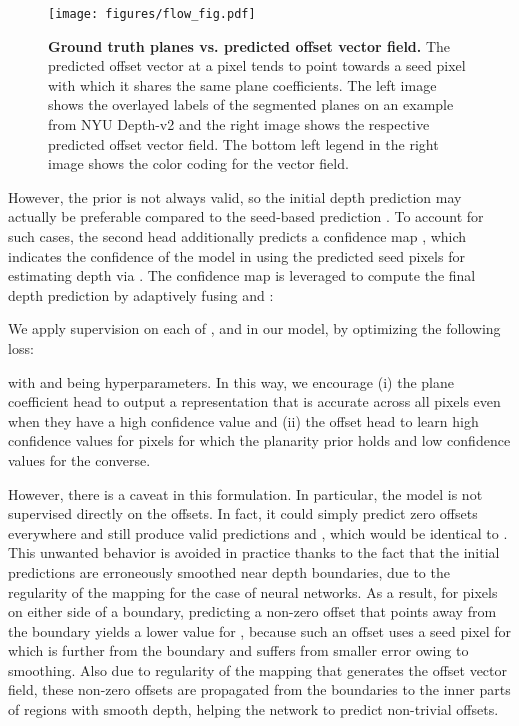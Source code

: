 \documentclass[final]{cvpr}
\begin{document}
\begin{figure}[!t]
\texttt{[image: figures/flow\_fig.pdf]}
\caption{\textbf{Ground truth planes vs. predicted offset vector field.} The predicted offset vector at a pixel tends to point towards a seed pixel with which it shares the same plane coefficients. The left image shows the overlayed labels of the segmented planes on an example from NYU Depth-v2 and the right image shows the respective predicted offset vector field. The bottom left legend in the right image shows the color coding for the vector field.}
\label{fig:flow_fig}
\vspace{-0.3cm}
\end{figure}

However, the prior is not always valid, so the initial depth prediction  may actually be preferable compared to the seed-based prediction . To account for such cases, the second head additionally predicts a confidence map , which indicates the confidence of the model in using the predicted seed pixels for estimating depth via . The confidence map is leveraged to compute the final depth prediction by adaptively fusing  and :

We apply supervision on each of ,  and  in our model, by optimizing the following loss:

with  and  being hyperparameters. In this way, we encourage (i) the plane coefficient head to output a representation that is accurate across all pixels even when they have a high confidence value and (ii) the offset head to learn high confidence values for pixels for which the planarity prior holds and low confidence values for the converse.

However, there is a caveat in this formulation. In particular, the model is not supervised directly on the offsets. In fact, it could simply predict zero offsets everywhere and still produce valid predictions  and , which would be identical to . This unwanted behavior is avoided in practice thanks to the fact that the initial predictions  are erroneously smoothed near depth boundaries, due to the regularity of the mapping  for the case of neural networks. As a result, for pixels on either side of a boundary, predicting a non-zero offset that points away from the boundary yields a lower value for , because such an offset uses a seed pixel for  which is further from the boundary and suffers from smaller error owing to smoothing. Also due to regularity of the mapping that generates the offset vector field, these non-zero offsets are propagated from the boundaries to the inner parts of regions with smooth depth, helping the network to predict non-trivial offsets.
\end{document}
